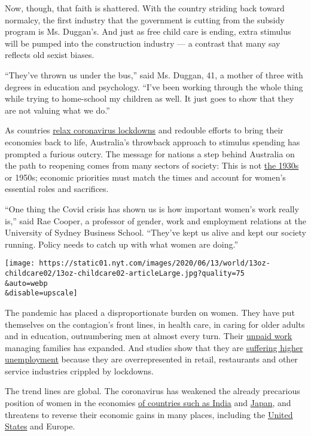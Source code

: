 Now, though, that faith is shattered. With the country striding back
toward normalcy, the first industry that the government is cutting from
the subsidy program is Ms. Duggan's. And just as free child care is
ending, extra stimulus will be pumped into the construction industry ---
a contrast that many say reflects old sexist biases.

``They've thrown us under the bus,'' said Ms. Duggan, 41, a mother of
three with degrees in education and psychology. ``I've been working
through the whole thing while trying to home-school my children as well.
It just goes to show that they are not valuing what we do.''

As countries
\href{https://www.nytimes.com/2020/06/09/world/coronavirus-reopenings.html}{relax
coronavirus lockdowns} and redouble efforts to bring their economies
back to life, Australia's throwback approach to stimulus spending has
prompted a furious outcry. The message for nations a step behind
Australia on the path to reopening comes from many sectors of society:
This is not
\href{https://rooseveltinstitute.org/wpa-flawed-model-women-inspiration-progress/}{the
1930s} or 1950s; economic priorities must match the times and account
for women's essential roles and sacrifices.

``One thing the Covid crisis has shown us is how important women's work
really is,'' said Rae Cooper, a professor of gender, work and employment
relations at the University of Sydney Business School. ``They've kept us
alive and kept our society running. Policy needs to catch up with what
women are doing.''

\texttt{[image: https://static01.nyt.com/images/2020/06/13/world/13oz-childcare02/13oz-childcare02-articleLarge.jpg?quality=75\\\&auto=webp\\\&disable=upscale]}

The pandemic has placed a disproportionate burden on women. They have
put themselves on the contagion's front lines, in health care, in caring
for older adults and in education, outnumbering men at almost every
turn. Their
\href{https://www.nytimes.com/2020/05/20/us/women-economy-jobs-coronavirus-gender.html}{unpaid
work} managing families has expanded. And studies show that they are
\href{https://nwlc-ciw49tixgw5lbab.stackpathdns.com/wp-content/uploads/2020/05/Jobs-Day-April-Factsheet.pdf}{suffering
higher unemployment} because they are overrepresented in retail,
restaurants and other service industries crippled by lockdowns.

The trend lines are global. The coronavirus has weakened the already
precarious position of women in the economies
\href{https://www.nytimes.com/2020/06/09/world/asia/india-coronavirus-women-economy.html}{of
countries such as India} and
\href{https://www.smh.com.au/business/markets/shock-absorbers-japanese-women-bear-brunt-of-recession-as-pandemic-unravels-abe-s-womenomics-20200612-p551wt.html}{Japan},
and threatens to reverse their economic gains in many places, including
the
\href{https://www.nytimes.com/2020/06/03/business/economy/coronavirus-working-women.html}{United
States} and Europe.

